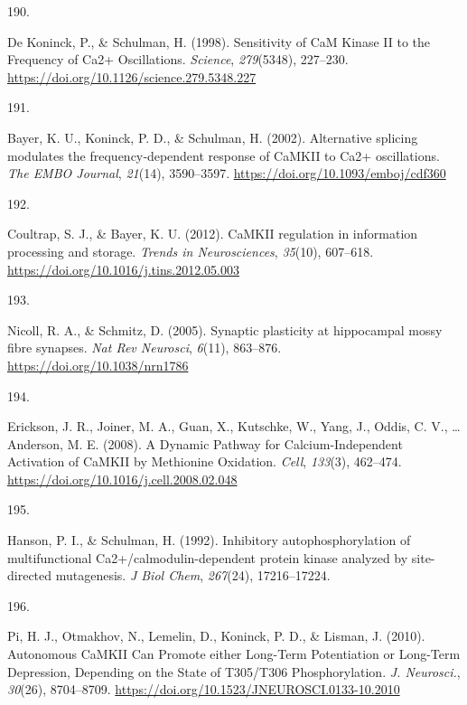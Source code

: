 \documentclass[
  11pt,
  letterpaper,
]{scrreprt}
\newlength{\cslhangindent}
\newlength{\csllabelwidth}
\newenvironment{CSLReferences}[2] %
 {\begin{list}{}{%
  \setlength{\itemindent}{0pt}
  \setlength{\leftmargin}{0pt}
  \setlength{\parsep}{0pt}
  \ifodd #1
   \setlength{\leftmargin}{\cslhangindent}
   \setlength{\itemindent}{-1\cslhangindent}
  \fi
  \setlength{\itemsep}{#2\baselineskip}}}
 {\end{list}}
\newcommand{\CSLLeftMargin}[1]{\parbox[t]{\csllabelwidth}{\strut#1\strut}}
\newcommand{\CSLRightInline}[1]{\parbox[t]{\linewidth - \csllabelwidth}{\strut#1\strut}}
\begin{document}
\begin{CSLReferences}{0}{0}
\CSLLeftMargin{190. }%
\CSLRightInline{De Koninck, P., \& Schulman, H. (1998). Sensitivity of
{CaM Kinase II} to the {Frequency} of {Ca2}+ {Oscillations}.
\emph{Science}, \emph{279}(5348), 227--230.
\url{https://doi.org/10.1126/science.279.5348.227}}

\CSLLeftMargin{191. }%
\CSLRightInline{Bayer, K. U., Koninck, P. D., \& Schulman, H. (2002).
Alternative splicing modulates the frequency‐dependent response of
{CaMKII} to {Ca2}+ oscillations. \emph{The EMBO Journal}, \emph{21}(14),
3590--3597. \url{https://doi.org/10.1093/emboj/cdf360}}

\CSLLeftMargin{192. }%
\CSLRightInline{Coultrap, S. J., \& Bayer, K. U. (2012). {CaMKII}
regulation in information processing and storage. \emph{Trends in
Neurosciences}, \emph{35}(10), 607--618.
\url{https://doi.org/10.1016/j.tins.2012.05.003}}

\CSLLeftMargin{193. }%
\CSLRightInline{Nicoll, R. A., \& Schmitz, D. (2005). Synaptic
plasticity at hippocampal mossy fibre synapses. \emph{Nat Rev Neurosci},
\emph{6}(11), 863--876. \url{https://doi.org/10.1038/nrn1786}}

\CSLLeftMargin{194. }%
\CSLRightInline{Erickson, J. R., Joiner, M. A., Guan, X., Kutschke, W.,
Yang, J., Oddis, C. V., \ldots{} Anderson, M. E. (2008). A {Dynamic
Pathway} for {Calcium-Independent Activation} of {CaMKII} by {Methionine
Oxidation}. \emph{Cell}, \emph{133}(3), 462--474.
\url{https://doi.org/10.1016/j.cell.2008.02.048}}

\CSLLeftMargin{195. }%
\CSLRightInline{Hanson, P. I., \& Schulman, H. (1992). Inhibitory
autophosphorylation of multifunctional {Ca2}+/calmodulin-dependent
protein kinase analyzed by site-directed mutagenesis. \emph{J Biol
Chem}, \emph{267}(24), 17216--17224.}

\CSLLeftMargin{196. }%
\CSLRightInline{Pi, H. J., Otmakhov, N., Lemelin, D., Koninck, P. D., \&
Lisman, J. (2010). Autonomous {CaMKII Can Promote} either {Long-Term
Potentiation} or {Long-Term Depression}, {Depending} on the {State} of
{T305}/{T306 Phosphorylation}. \emph{J. Neurosci.}, \emph{30}(26),
8704--8709. \url{https://doi.org/10.1523/JNEUROSCI.0133-10.2010}}


\end{CSLReferences}
\end{document}
